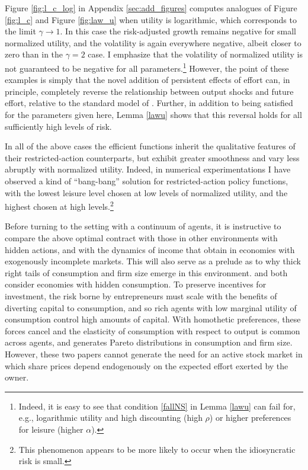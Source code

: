 \documentclass[11pt]{article}
\theoremstyle{plain}
\begin{document}
Figure \ref{fig:l_c_log} in Appendix \ref{sec:add_figures} computes analogues of Figure \ref{fig:l_c} and Figure \ref{fig:law_u} when utility is logarithmic, which corresponds to the limit $\gamma \rightarrow 1$. In this case the risk-adjusted growth remains negative for small normalized utility, and the volatility is again everywhere negative, albeit closer to zero than in the $\gamma=2$ case. I emphasize that the volatility of normalized utility is not guaranteed to be negative for all parameters.\footnote{Indeed, it is easy to see that condition \eqref{fallNS} in Lemma \ref{lawu} can fail for, e.g., logarithmic utility and high discounting (high $\rho$) or higher preferences for leisure (higher $\alpha$).} However, the point of these examples is simply that the novel addition of persistent effects of effort can, in principle, completely reverse the relationship between output shocks and future effort, relative to the standard model of \cite{sannikov_continuous-time_2008}. Further, in addition to being satisfied for the parameters given here, Lemma \ref{lawu} shows that this reversal holds for all sufficiently high levels of risk. 

In all of the above cases the efficient functions inherit the qualitative features of their restricted-action counterparts, but exhibit greater smoothness and vary less abruptly with normalized utility. Indeed, in numerical experimentations I have observed a kind of ``bang-bang'' solution for restricted-action policy functions, with the lowest leisure level chosen at low levels of normalized utility, and the highest chosen at high levels.\footnote{This phenomenon appears to be more likely to occur when the idiosyncratic risk is small.}

Before turning to the setting with a continuum of agents, it is instructive to compare the above optimal contract with those in other environments with hidden actions, and with the dynamics of income that obtain in economies with exogenously incomplete markets. This will also serve as a prelude as to why thick right tails of consumption and firm size emerge in this environment. \cite{shourideh_optimal_2013} and \cite{phelan_optimality_2022} both consider economies with hidden consumption. To preserve incentives for investment, the risk borne by entrepreneurs must scale with the benefits of diverting capital to consumption, and so rich agents with low marginal utility of consumption control high amounts of capital. With homothetic preferences, these forces cancel and the elasticity of consumption with respect to output is common across agents, and generates Pareto distributions in consumption and firm size. However, these two papers cannot generate the need for an active stock market in which share prices depend endogenously on the expected effort exerted by the owner.
\end{document}
